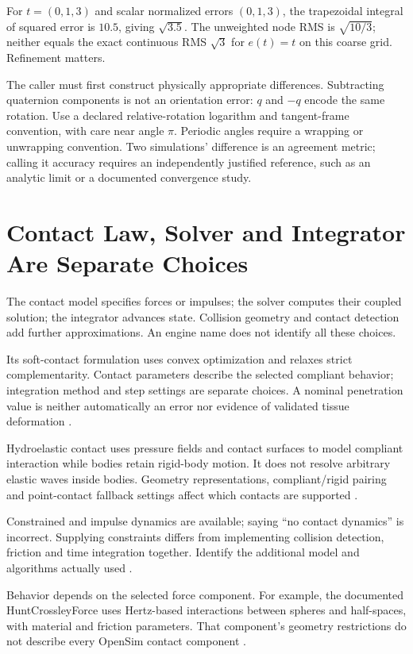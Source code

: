 For $t=(0,1,3)$ and scalar normalized errors $(0,1,3)$, the trapezoidal integral
of squared error is $10.5$, giving $\sqrt{3.5}$. The unweighted node RMS is
$\sqrt{10/3}$; neither equals the exact continuous RMS $\sqrt{3}$ for
$e(t)=t$ on this coarse grid. Refinement matters.

The caller must first construct physically appropriate differences. Subtracting
quaternion components is not an orientation error: $q$ and $-q$ encode the same
rotation. Use a declared relative-rotation logarithm and tangent-frame convention,
with care near angle $\pi$. Periodic angles require a wrapping or unwrapping
convention. Two simulations' difference is an agreement metric; calling it
accuracy requires an independently justified reference, such as an analytic
limit or a documented convergence study.

\section{Contact Law, Solver and Integrator Are Separate Choices}

The contact model specifies forces or impulses; the solver computes their
coupled solution; the integrator advances state. Collision geometry and contact
detection add further approximations. An engine name does not identify all
these choices.

\begin{description}[style=nextline]
 \item[MuJoCo.] Its soft-contact formulation uses convex optimization and
 relaxes strict complementarity. Contact parameters describe the selected
 compliant behavior; integration method and step settings are separate choices.
 A nominal penetration value is neither automatically an error nor evidence
 of validated tissue deformation \cite{MuJoCoComputationReview}.
 \item[Drake.] Hydroelastic contact uses pressure fields and contact surfaces
 to model compliant interaction while bodies retain rigid-body motion. It does
 not resolve arbitrary elastic waves inside bodies. Geometry representations,
 compliant/rigid pairing and point-contact fallback settings affect which
 contacts are supported \cite{DrakeHydroelasticReview}.
 \item[Pinocchio.] Constrained and impulse dynamics are available; saying
 ``no contact dynamics'' is incorrect. Supplying constraints differs from
 implementing collision detection, friction and time integration together.
 Identify the additional model and algorithms actually used
 \cite{PinocchioAlgorithmsReview}.
 \item[OpenSim.] Behavior depends on the selected force component. For example,
 the documented HuntCrossleyForce uses Hertz-based interactions between spheres
 and half-spaces, with material and friction parameters. That component's
 geometry restrictions do not describe every OpenSim contact component
 \cite{OpenSimHuntCrossleyReview}.
\end{description}

